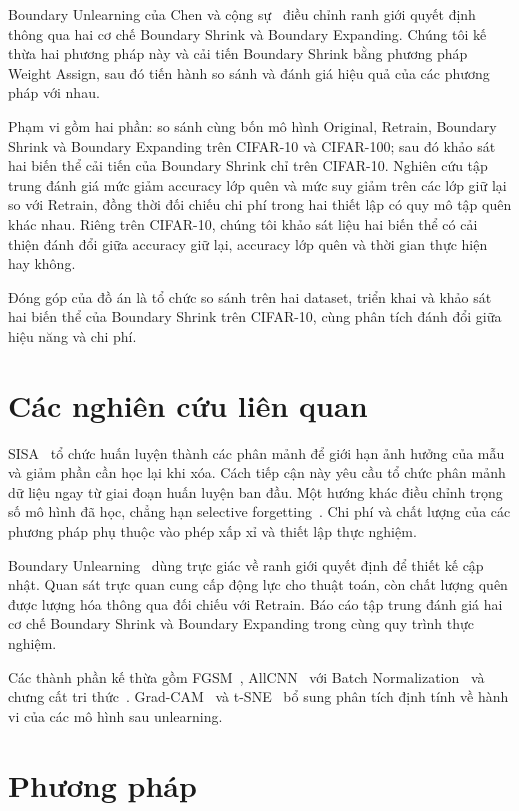 \documentclass[conference]{IEEEtran}
\begin{document}
Boundary Unlearning của Chen và cộng sự~\cite{chen2023boundary} điều chỉnh ranh giới quyết định thông qua hai cơ chế Boundary Shrink và Boundary Expanding. Chúng tôi kế thừa hai phương pháp này và cải tiến Boundary Shrink bằng phương pháp Weight Assign, sau đó tiến hành so sánh và đánh giá hiệu quả của các phương pháp với nhau.

Phạm vi gồm hai phần: so sánh cùng bốn mô hình Original, Retrain, Boundary Shrink và Boundary Expanding trên CIFAR-10 và CIFAR-100; sau đó khảo sát hai biến thể cải tiến của Boundary Shrink chỉ trên CIFAR-10. Nghiên cứu tập trung đánh giá mức giảm accuracy lớp quên và mức suy giảm trên các lớp giữ lại so với Retrain, đồng thời đối chiếu chi phí trong hai thiết lập có quy mô tập quên khác nhau. Riêng trên CIFAR-10, chúng tôi khảo sát liệu hai biến thể có cải thiện đánh đổi giữa accuracy giữ lại, accuracy lớp quên và thời gian thực hiện hay không.

Đóng góp của đồ án là tổ chức so sánh trên hai dataset, triển khai và khảo sát hai biến thể của Boundary Shrink trên CIFAR-10, cùng phân tích đánh đổi giữa hiệu năng và chi phí.

\section{Các nghiên cứu liên quan}
SISA~\cite{bourtoule2021machine} tổ chức huấn luyện thành các phân mảnh để giới hạn ảnh hưởng của mẫu và giảm phần cần học lại khi xóa. Cách tiếp cận này yêu cầu tổ chức phân mảnh dữ liệu ngay từ giai đoạn huấn luyện ban đầu. Một hướng khác điều chỉnh trọng số mô hình đã học, chẳng hạn selective forgetting~\cite{golatkar2020eternal}. Chi phí và chất lượng của các phương pháp phụ thuộc vào phép xấp xỉ và thiết lập thực nghiệm.

Boundary Unlearning~\cite{chen2023boundary} dùng trực giác về ranh giới quyết định để thiết kế cập nhật. Quan sát trực quan cung cấp động lực cho thuật toán, còn chất lượng quên được lượng hóa thông qua đối chiếu với Retrain. Báo cáo tập trung đánh giá hai cơ chế Boundary Shrink và Boundary Expanding trong cùng quy trình thực nghiệm.

Các thành phần kế thừa gồm FGSM~\cite{goodfellow2015explaining}, AllCNN~\cite{springenberg2015allcnn} với Batch Normalization~\cite{ioffe2015batch} và chưng cất tri thức~\cite{hinton2015distilling}. Grad-CAM~\cite{selvaraju2017gradcam} và t-SNE~\cite{maaten2008tsne} bổ sung phân tích định tính về hành vi của các mô hình sau unlearning.
\section{Phương pháp}
\end{document}
